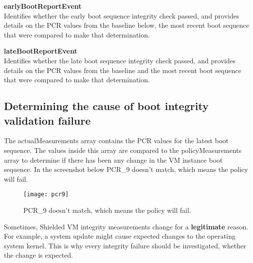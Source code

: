 \textbf{earlyBootReportEvent}\\
Identifies whether the early boot sequence integrity check passed, 
and provides details on the PCR values from the baseline below,
the most recent boot sequence that were compared to make that determination.

\textbf{lateBootReportEvent}\\
Identifies whether the late boot sequence integrity check passed, 
and provides details on the PCR values from the baseline 
and the most recent boot sequence that were compared to make that determination.

\subsection{Determining the cause of boot integrity validation failure}
The actualMeasurements array contains the PCR values 
for the latest boot sequence. 
The values inside this array are compared to the policyMeasurements array 
to determine if there has been any change in the VM instance boot sequence. 
In the screenshot below PCR\_9 doesn’t match, which means the policy will fail.

\begin{figure}[!ht]
    \centering
    \texttt{[image: pcr9]}
    \caption{ PCR\_9 doesn’t match, which means the policy will fail.}
    \label{fig:pcr9}
\end{figure}

Sometimes, Shielded VM integrity measurements change for a \textbf{legitimate} reason. 
For example, a system update might cause expected changes to the operating system kernel. 
This is why every integrity failure should be investigated, whether the change is expected.